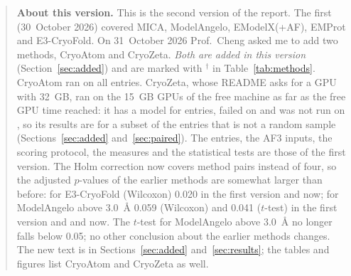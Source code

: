 \begin{quote}\small\noindent
\textbf{About this version.} This is the second version of the report. The first (30~October 2026) covered MICA, ModelAngelo, EModelX(+AF), EMProt and E3-CryoFold. On 31~October 2026 Prof.\ Cheng asked me to add two methods, CryoAtom and CryoZeta. \emph{Both are added in this version} (Section~\ref{sec:added}) and are marked with $^\dagger$ in Table~\ref{tab:methods}. CryoAtom ran on all \NEntries{} entries. CryoZeta, whose README asks for a GPU with 32~GB, ran on the 15~GB GPUs of the free machine as far as the free GPU time reached: it has a model for \NModelCryozeta{} entries, failed on \NFailedCryozeta{} and was not run on \NNotRunCryozeta{}, so its results are for a subset of the entries that is not a random sample (Sections~\ref{sec:added} and~\ref{sec:paired}). The entries, the AF3 inputs, the scoring protocol, the measures and the statistical tests are those of the first version. The Holm correction now covers \NFamilyWord{} method pairs instead of four, so the adjusted $p$-values of the earlier methods are somewhat larger than before: for E3-CryoFold (Wilcoxon) 0.020 in the first version and \PwHolmTmEthree{} now; for ModelAngelo above 3.0~\AA{} 0.059 (Wilcoxon) and 0.041 ($t$-test) in the first version and \PwHolmTmAngeloHigh{} and \PtHolmTmAngeloHigh{} now. The $t$-test for ModelAngelo above 3.0~\AA{} no longer falls below 0.05; no other conclusion about the earlier methods changes. The new text is in Sections~\ref{sec:added} and~\ref{sec:results}; the tables and figures list CryoAtom and CryoZeta as well.
\end{quote}

